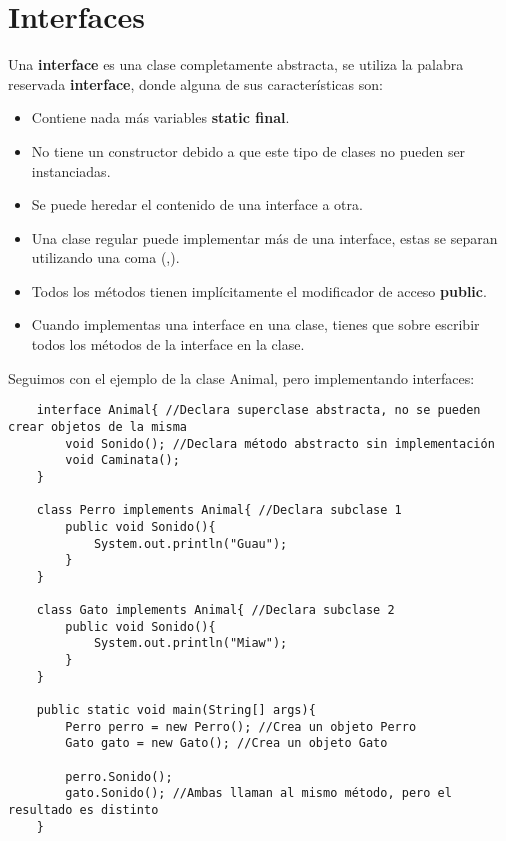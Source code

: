 \section{Interfaces}
Una \textbf{interface} es una clase completamente abstracta, se utiliza la palabra reservada \textbf{interface}, donde alguna de sus características son:
\begin{itemize}
    \item Contiene nada más variables \textbf{static final}.
    \item No tiene un constructor debido a que este tipo de clases no pueden ser instanciadas.
    \item Se puede heredar el contenido de una interface a otra.
    \item Una clase regular puede implementar más de una interface, estas se separan utilizando una coma (,).
    \item Todos los métodos tienen implícitamente el modificador de acceso \textbf{public}.
    \item Cuando implementas una interface en una clase, tienes que sobre escribir todos los métodos de la interface en la clase.
\end{itemize}
Seguimos con el ejemplo de la clase Animal, pero implementando interfaces:
\begin{lstlisting}
    interface Animal{ //Declara superclase abstracta, no se pueden crear objetos de la misma
        void Sonido(); //Declara método abstracto sin implementación
        void Caminata();
    }
    
    class Perro implements Animal{ //Declara subclase 1
        public void Sonido(){
            System.out.println("Guau");
        }
    }
    
    class Gato implements Animal{ //Declara subclase 2
        public void Sonido(){
            System.out.println("Miaw");
        }
    }
    
    public static void main(String[] args){
        Perro perro = new Perro(); //Crea un objeto Perro
        Gato gato = new Gato(); //Crea un objeto Gato
        
        perro.Sonido();
        gato.Sonido(); //Ambas llaman al mismo método, pero el resultado es distinto
    }
\end{lstlisting}



